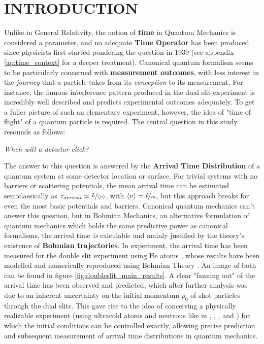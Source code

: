 \section{INTRODUCTION}

Unlike in General Relativity, the notion of \textbf{time} in Quantum Mechanics is considered a parameter, and no adequate \textbf{Time Operator} has been produced since physicists first started pondering the question in 1939 (see appendix \ref{ap:time_context} for a deeper treatment). Canonical quantum formalism seems to be particularly concerned with \textbf{measurement outcomes}, with less interest in the \textit{journey} that a particle takes from its \textit{conception} to its measurement. For instance, the famous interference pattern produced in the dual slit experiment is incredibly well described and predicts experimental outcomes adequately. To get a fuller picture of such an elementary experiment, however, the idea of "time of flight" of a quantum particle is required. The central question in this study resounds as follows:
\begin{center}
    \textit{When will a detector click?}
\end{center}
The answer to this question is answered by the \textbf{Arrival Time Distribution} of a quantum system at some detector location or surface. For trivial systems with no barriers or scattering potentials, the mean arrival time can be estimated semiclassically as $\tau_{arrival} \simeq \nicefrac{L}{\langle v \rangle}$, with $\langle v\rangle=\nicefrac{\hat{p}}{m}$, but this approach breaks for even the most basic potentials and barriers. Canonical quantum mechanics can't answer this question, but in Bohmian Mechanics, an alternative formulation of quantum mechanics which holds the same predictive power as canonical formalisms, the arrival time \textit{is} calculable and mainly justified by the theory's existence of \textbf{Bohmian trajectories}. In experiment, the arrival time has been measured for the double slit experiment using He atoms \cite{kurtsiefer1997measurement}, whose results have been modelled and numerically reproduced using Bohmian Theory \cite{DAS2025170054} \cite{das2022double}. An image of both can be found in figure \ref{fig:doubleslit_main_results}. A clear "fanning out" of the arrival time has been observed and predicted, which after further analysis was due to an inherent uncertainty on the initial momentum $p_0$ of shot particles through the dual slits. This gave rise to the idea of conceiving a physically realizable experiment (using ultracold atoms and neutrons like in \cite{vincent2009quantumtrampolineultracoldatoms}, \cite{Debu:2861358}, \cite{Zakharov_2016}, and \cite{KULIN201538}) for which the initial conditions can be controlled exactly, allowing precise prediction and subsequent measurement of arrival time distributions in quantum mechanics.

